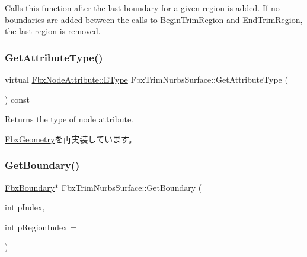 Calls this function after the last boundary for a given region is added. If no boundaries are added between the calls to Begin\+Trim\+Region and End\+Trim\+Region, the last region is removed. \mbox{\label{class_fbx_trim_nurbs_surface_a2d60f9613978db561ac32e2efff35104}} 
\subsubsection{\texorpdfstring{Get\+Attribute\+Type()}{GetAttributeType()}}
{\footnotesize\ttfamily virtual \hyperlink{class_fbx_node_attribute_a08e1669d3d1a696910756ab17de56d6a}{Fbx\+Node\+Attribute\+::\+E\+Type} Fbx\+Trim\+Nurbs\+Surface\+::\+Get\+Attribute\+Type (\begin{DoxyParamCaption}{ }\end{DoxyParamCaption}) const\hspace{0.3cm}{\ttfamily [virtual]}}



Returns the type of node attribute. 



\hyperlink{class_fbx_geometry_a41ae23e5d0cf08693bca49737f333de9}{Fbx\+Geometry}を再実装しています。

\mbox{\label{class_fbx_trim_nurbs_surface_af42e403f540581bee858f76fbd39f6b5}} 
\subsubsection{\texorpdfstring{Get\+Boundary()}{GetBoundary()}\hspace{0.1cm}{\footnotesize\ttfamily [1/2]}}
{\footnotesize\ttfamily \hyperlink{class_fbx_boundary}{Fbx\+Boundary}$\ast$ Fbx\+Trim\+Nurbs\+Surface\+::\+Get\+Boundary (\begin{DoxyParamCaption}\item[{int}]{p\+Index,  }\item[{int}]{p\+Region\+Index = {} }\end{DoxyParamCaption})}


